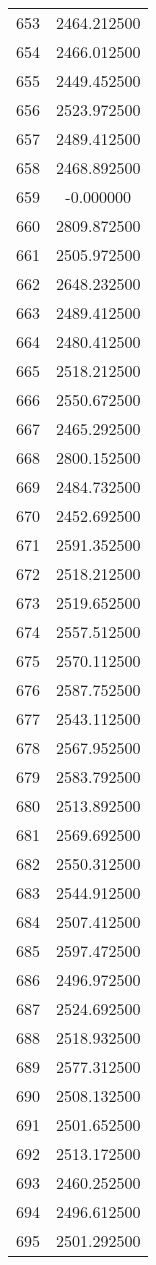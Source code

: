 \documentclass[12pt]{article}
\begin{document}
\begin{longtable}{@{}cc@{}}
653 & 2464.212500 \\
654 & 2466.012500 \\
655 & 2449.452500 \\
656 & 2523.972500 \\
657 & 2489.412500 \\
658 & 2468.892500 \\
659 & -0.000000 \\
660 & 2809.872500 \\
661 & 2505.972500 \\
662 & 2648.232500 \\
663 & 2489.412500 \\
664 & 2480.412500 \\
665 & 2518.212500 \\
666 & 2550.672500 \\
667 & 2465.292500 \\
668 & 2800.152500 \\
669 & 2484.732500 \\
670 & 2452.692500 \\
671 & 2591.352500 \\
672 & 2518.212500 \\
673 & 2519.652500 \\
674 & 2557.512500 \\
675 & 2570.112500 \\
676 & 2587.752500 \\
677 & 2543.112500 \\
678 & 2567.952500 \\
679 & 2583.792500 \\
680 & 2513.892500 \\
681 & 2569.692500 \\
682 & 2550.312500 \\
683 & 2544.912500 \\
684 & 2507.412500 \\
685 & 2597.472500 \\
686 & 2496.972500 \\
687 & 2524.692500 \\
688 & 2518.932500 \\
689 & 2577.312500 \\
690 & 2508.132500 \\
691 & 2501.652500 \\
692 & 2513.172500 \\
693 & 2460.252500 \\
694 & 2496.612500 \\
695 & 2501.292500 \\

\end{longtable}
\end{document}

